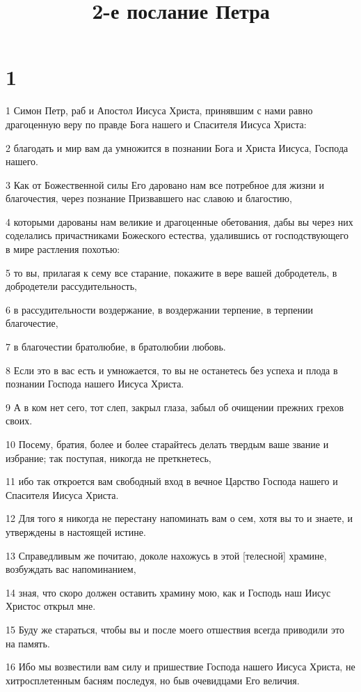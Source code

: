 

\title{2-е послание Петра}


\chapter{1}

\par 1 Симон Петр, раб и Апостол Иисуса Христа, принявшим с нами равно драгоценную веру по правде Бога нашего и Спасителя Иисуса Христа:
\par 2 благодать и мир вам да умножится в познании Бога и Христа Иисуса, Господа нашего.
\par 3 Как от Божественной силы Его даровано нам все потребное для жизни и благочестия, через познание Призвавшего нас славою и благостию,
\par 4 которыми дарованы нам великие и драгоценные обетования, дабы вы через них соделались причастниками Божеского естества, удалившись от господствующего в мире растления похотью:
\par 5 то вы, прилагая к сему все старание, покажите в вере вашей добродетель, в добродетели рассудительность,
\par 6 в рассудительности воздержание, в воздержании терпение, в терпении благочестие,
\par 7 в благочестии братолюбие, в братолюбии любовь.
\par 8 Если это в вас есть и умножается, то вы не останетесь без успеха и плода в познании Господа нашего Иисуса Христа.
\par 9 А в ком нет сего, тот слеп, закрыл глаза, забыл об очищении прежних грехов своих.
\par 10 Посему, братия, более и более старайтесь делать твердым ваше звание и избрание; так поступая, никогда не преткнетесь,
\par 11 ибо так откроется вам свободный вход в вечное Царство Господа нашего и Спасителя Иисуса Христа.
\par 12 Для того я никогда не перестану напоминать вам о сем, хотя вы то и знаете, и утверждены в настоящей истине.
\par 13 Справедливым же почитаю, доколе нахожусь в этой [телесной] храмине, возбуждать вас напоминанием,
\par 14 зная, что скоро должен оставить храмину мою, как и Господь наш Иисус Христос открыл мне.
\par 15 Буду же стараться, чтобы вы и после моего отшествия всегда приводили это на память.
\par 16 Ибо мы возвестили вам силу и пришествие Господа нашего Иисуса Христа, не хитросплетенным басням последуя, но быв очевидцами Его величия.
